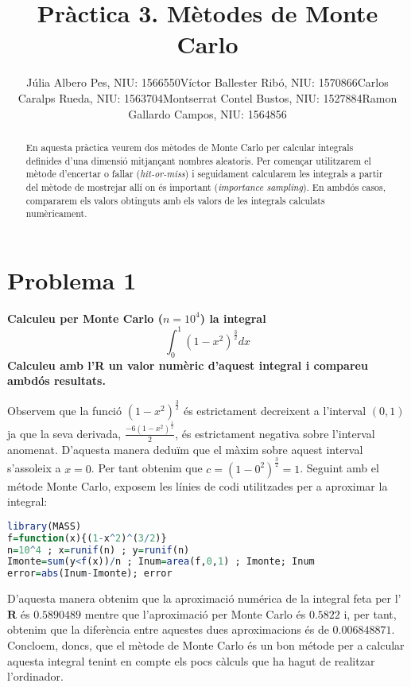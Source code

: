 \documentclass[11pt,a4paper]{article}
\title{\bfseries\Large Pràctica 3. Mètodes de Monte Carlo}
\author{Júlia Albero Pes, NIU: 1566550\endgraf Víctor Ballester Ribó, NIU: 1570866\endgraf Carlos Caralps Rueda, NIU: 1563704\endgraf Montserrat Contel Bustos, NIU: 1527884\endgraf Ramon Gallardo Campos, NIU: 1564856}
\date{\parbox{\linewidth}{\centering
  Probabilitat i Modelització Estocàstica\endgraf
  Grau en Matemàtiques\endgraf
  Universitat Autònoma de Barcelona\endgraf
  Desembre de 2021}}
\begin{document}
\maketitle
\begin{abstract}
  \noindent En aquesta pràctica veurem dos mètodes de Monte Carlo per calcular integrals definides d'una dimensió mitjançant nombres aleatoris. Per començar utilitzarem el mètode d'encertar o fallar (\textit{hit-or-miss}) i seguidament calcularem les integrals a partir del mètode de mostrejar allí on és important (\textit{importance sampling}). En ambdós casos, compararem els valors obtinguts amb els valors de les integrals calculats numèricament.
\end{abstract}
\thispagestyle{empty}
\newpage
\setcounter{page}{1}
\restoregeometry
\newpage

\section*{Problema 1}
\textbf{Calculeu per Monte Carlo ($n=10^4$) la integral
$$\int_{0}^{1}(1-x^2)^{\frac{3}{2}}dx$$
Calculeu amb l'R un valor numèric d'aquest integral i compareu ambdós resultats.}

Observem que la funció $(1-x^2)^{\frac{3}{2}}$ és estrictament decreixent a l'interval $(0,1)$ ja que la seva derivada, $\frac{-6(1-x^2)^{\frac{1}{2}}}{2}$, és estrictament negativa sobre l'interval anomenat. D'aquesta manera deduïm que el màxim sobre aquest interval s'assoleix a $x=0$. Per tant obtenim que $c=(1-0^2)^{\frac{3}{2}}=1$. Seguint amb el métode Monte Carlo, exposem les línies de codi utilitzades per a aproximar la integral:
\begin{lstlisting}[language=R, caption={Programa del problema 1},xleftmargin=.08\textwidth,xrightmargin=.08\textwidth]
library(MASS)
f=function(x){(1-x^2)^(3/2)}
n=10^4 ; x=runif(n) ; y=runif(n)
Imonte=sum(y<f(x))/n ; Inum=area(f,0,1) ; Imonte; Inum
error=abs(Inum-Imonte); error
\end{lstlisting}

D'aquesta manera obtenim que la aproximació numérica de la integral feta per l'$\textbf{R}$ és $0.5890489$ mentre que l'aproximació per Monte Carlo és $0.5822$ i, per tant, obtenim que la diferència entre aquestes dues aproximacions és de $0.006848871$. Concloem, doncs, que el mètode de Monte Carlo és un bon métode per a calcular aquesta integral tenint en compte els pocs càlculs que ha hagut de realitzar l'ordinador.
\end{document}
